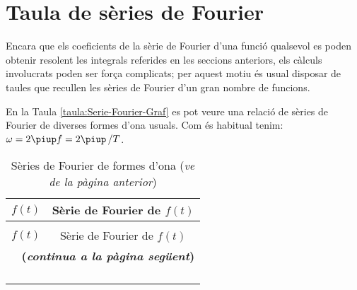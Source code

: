 \section{Taula de sèries de Fourier}

Encara que els coeficients de la sèrie de Fourier d'una funció qualsevol es poden
obtenir resolent les integrals referides en les seccions anteriors, els càlculs
involucrats poden ser força complicats; per aquest motiu és usual
disposar de taules que recullen les sèries de Fourier d'un
gran nombre de funcions.

En la Taula \vref{taula:Serie-Fourier-Graf} es pot veure una relació de
sèries de Fourier de diverses formes d'ona usuals. Com és habitual tenim: $\omega=2\piup f = 2\piup\, / T$.

\begin{longtable}{cc}
   \caption{\label{taula:Serie-Fourier-Graf} Sèries de Fourier de formes d'ona}\\
   \toprule[1pt]
   $f(t)$ & Sèrie de Fourier de $f(t)$\\
   \midrule
   \endfirsthead
   \caption[]{Sèries de Fourier de formes d'ona (\emph{ve de la pàgina anterior})} \\
   \toprule[1pt]
   $f(t)$ & Sèrie de Fourier de $f(t)$\\
   \midrule
   \endhead
   \midrule
   \multicolumn{2}{r}{\sffamily\bfseries\color{NavyBlue}(\emph{continua a la pàgina següent})}
   \endfoot
   \endlastfoot
    & \raisebox{0.8cm}{$\displaystyle\frac{K}{2} + \frac{{2K}}{\piup }\sum\limits_{n = 1}^\infty  {\frac{{\sin \big((2n - 1)\omega t\big)}}{{2n - 1}}}$}\\[2.4ex]
    & \raisebox{1.2cm}{$\displaystyle\frac{{4K}}{\piup }\sum\limits_{n = 1}^\infty  {\frac{{\sin \big((2n - 1)\omega t\big)}}{{2n - 1}}}$}\\[2.4ex]
    & \raisebox{0.8cm}{$\displaystyle\frac{{K \tau }}{{T}} + \frac{{2K}}{\piup }\sum\limits_{n = 1}^\infty  {\frac{{( - 1)^n \sin \left(\dfrac{{n\omega \tau }}{2}\right)\cos (n\omega t)}}{n}}$} \\[2.4ex]
    & \raisebox{1.2cm}{$\displaystyle\frac{{2K}}{\piup }\sum\limits_{n = 1}^\infty  {\frac{{( - 1)^n (\cos (n\omega \tau )-1)\sin (n\omega t)}}{n}}$} \\[2.4ex]
    & \raisebox{1.2cm}{$\displaystyle\frac{{4K}}{{\piup }}\sum\limits_{n = 1}^\infty  {\frac{{ (-1)^{n+1}\sin \left(\dfrac{{(2n-1)\omega \tau }}{2}\right)\sin \big((2n-1)\omega t\big)}}{2n-1}}$} \\[2.4ex]

\end{longtable}
